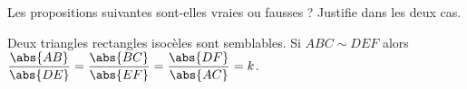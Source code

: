 %
%
    Les propositions suivantes sont-elles vraies ou fausses ? Justifie dans les deux cas.
    \begin{tasks}
        \task Deux triangles rectangles isocèles sont semblables.
        \task Si \(ABC \sim DEF\) alors \(\dfrac{\abs{AB}}{\abs{DE}} = \dfrac{\abs{BC}}{\abs{EF}} = \dfrac{\abs{DF}}{\abs{AC}} = k\).
    \end{tasks}
